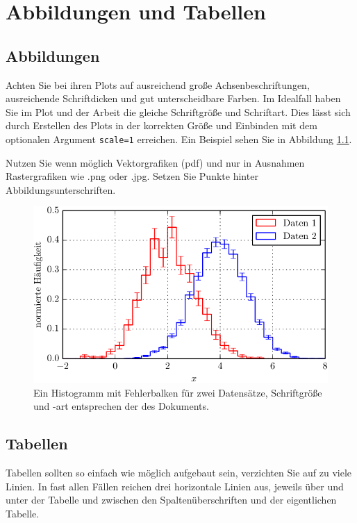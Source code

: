 \chapter{Abbildungen und Tabellen}

\section{Abbildungen}

Achten Sie bei ihren Plots auf ausreichend große Achsenbeschriftungen, ausreichende Schriftdicken und gut unterscheidbare Farben.
Im Idealfall haben Sie im Plot und der Arbeit die gleiche Schriftgröße und Schriftart.
Dies lässt sich durch Erstellen des Plots in der korrekten Größe und Einbinden mit dem optionalen Argument \texttt{scale=1} erreichen. Ein Beispiel sehen Sie in Abbildung \ref{fig:bsp}.

Nutzen Sie wenn möglich Vektorgrafiken (pdf) und nur in Ausnahmen Rastergrafiken wie .png oder .jpg.
Setzen Sie Punkte hinter Abbildungsunterschriften.

\begin{figure}
    \centering
    \includegraphics[scale=1]{./Plots/Histogramm.pdf}
    \caption{Ein Histogramm mit Fehlerbalken für zwei Datensätze, Schriftgröße und -art entsprechen der des Dokuments.}
    \label{fig:bsp}
\end{figure}

\section{Tabellen}

Tabellen sollten so einfach wie möglich aufgebaut sein, verzichten Sie auf zu viele Linien. In fast allen Fällen reichen drei horizontale Linien aus, jeweils über und unter der Tabelle und zwischen den Spaltenüberschriften und der eigentlichen Tabelle.

